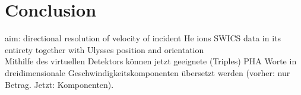 
\chapter{Conclusion} %

\label{chap:concl} %

aim: directional resolution of velocity of incident He ions
SWICS data in its entirety
together with
Ulysses position and orientation 
\\
Mithilfe des virtuellen Detektors können jetzt geeignete (Triples) PHA Worte in dreidimensionale Geschwindigkeitskomponenten übersetzt werden (vorher: nur Betrag. Jetzt: Komponenten).